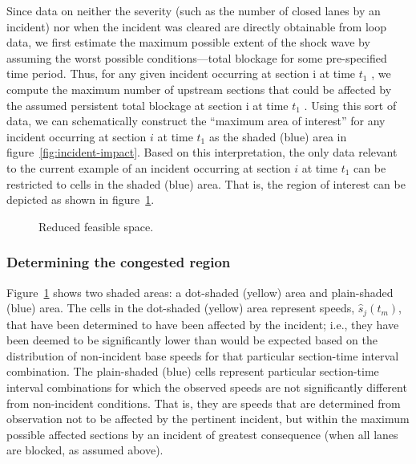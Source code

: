 \documentclass[12pt]{report}
\newcommand{\inputTikZ}[1]{%
    \begin{singlespace}
    \end{singlespace}
  }
\newcommand{\inputTikZ}[1]{%
    \begin{singlespace}
    \beginpgfgraphicnamed{#1-external}%
    \endpgfgraphicnamed%
    \end{singlespace}
  }
\newcounter{time}
\newcounter{space}
\begin{document}
Since data on neither the severity (such as the number of closed lanes
by an incident) nor when the incident was cleared are directly
obtainable from loop data, we first estimate the maximum possible
extent of the shock wave by assuming the worst possible
conditions---total blockage for some pre-specified time period. Thus,
for any given incident occurring at section i at time $t_1$ , we
compute the maximum number of upstream sections that could be affected
by the assumed persistent total blockage at section i at time $t_1$
. Using this sort of data, we can schematically construct the
``maximum area of interest'' for any incident occurring at section $i$
at time $t_1$ as the shaded (blue) area in
figure~\ref{fig:incident-impact}. Based on this interpretation, the
only data relevant to the current example of an incident occurring at
section $i$ at time $t_1$ can be restricted to cells in the shaded
(blue) area. That is, the region of interest can be depicted as shown
in figure~\ref{fig:incident-impact-feas}.
\begin{figure}[tbp]
  \begin{center}
    \inputTikZ{figs/time-space-incident-schematic-reduced}
    \caption[Reduced feasible space]{Reduced feasible space.}
    \label{fig:incident-impact-feas}
  \end{center}
\end{figure}


\subsubsection{Determining the congested region}
\label{sec:det-cong-reg}

Figure~\ref{fig:incident-impact-feas} shows two shaded areas: a
dot-shaded (yellow) area and plain-shaded (blue) area. The cells in
the dot-shaded (yellow) area represent speeds, $\hat{s}_j(t_m)$, that
have been determined to have been affected by the incident; i.e., they
have been deemed to be significantly lower than would be expected
based on the distribution of non-incident base speeds for that
particular section-time interval combination.  The plain-shaded (blue)
cells represent particular section-time interval combinations for
which the observed speeds are not significantly different from
non-incident conditions.  That is, they are speeds that are determined
from observation not to be affected by the pertinent incident, but
within the maximum possible affected  sections by an
incident of greatest consequence (when all lanes are blocked, as
assumed above).
\end{document}
